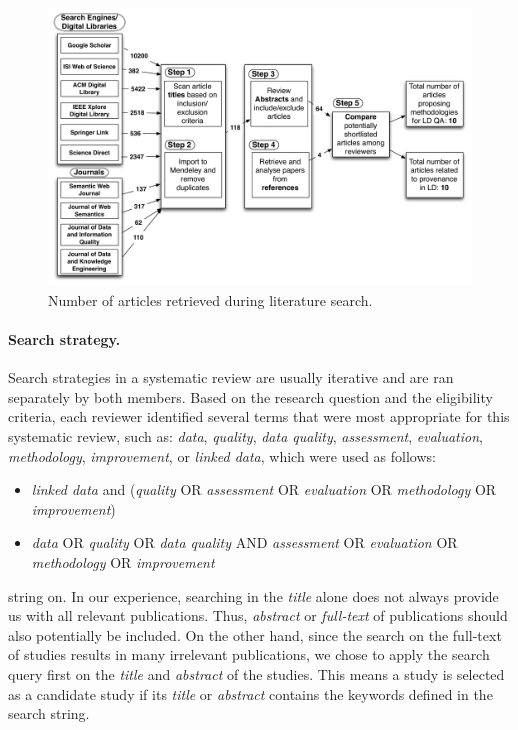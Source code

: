 \begin{figure}[ht]
\includegraphics[width=6.5in]{Numberofarticles.pdf}
\caption{Number of articles retrieved during literature search.}
\label{fig:noofarticles}
\end{figure}

\paragraph{Search strategy.}
Search strategies in a systematic review are usually iterative and are ran separately by both members. 
Based on the research question and the eligibility criteria, each reviewer identified several terms that were most appropriate for this systematic review, such as: \textit{data}, \textit{quality}, \textit{data quality}, \textit{assessment}, \textit{evaluation}, \textit{methodology}, \textit{improvement}, or \textit{linked data}, which were used as follows:
\begin{itemize}
\item \textit{linked data} and (\textit{quality} OR \textit{assessment} OR \textit{evaluation} OR \textit{methodology} OR \textit{improvement})
\item  \textit{data} OR \textit{quality} OR \textit{data quality} AND \textit{assessment} OR \textit{evaluation} OR \textit{methodology} OR \textit{improvement}
\end{itemize}
string on. 
In our experience, searching in the \textit{title} alone does not always provide us with all relevant publications. 
Thus, \textit{abstract} or \textit{full-text} of publications should also potentially be included. 
On the other hand, since the search on the full-text of studies results in many irrelevant publications, we chose to apply the search query first on the \textit{title} and \textit{abstract} of the studies.
This means a study is selected as a candidate study if its \textit{title} or \textit{abstract} contains the keywords defined in the search string.

